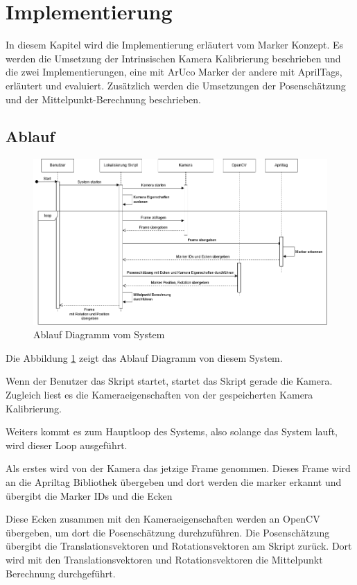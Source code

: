 \section{Implementierung}

In diesem Kapitel wird die Implementierung erläutert vom Marker Konzept. 
Es werden die Umsetzung der Intrinsischen Kamera Kalibrierung beschrieben und die zwei Implementierungen, eine mit ArUco Marker der andere mit AprilTags, erläutert und evaluiert.
Zusätzlich werden die Umsetzungen der Posenschätzung und der Mittelpunkt-Berechnung beschrieben.

\subsection{Ablauf}

\begin{figure}[H]
    \centering
    \includegraphics[width=\linewidth]{graphics/Ablauf.png}
    \caption{Ablauf Diagramm vom System}
    \label{fig:Ablauf}
\end{figure}

Die Abbildung \ref{fig:Ablauf} zeigt das Ablauf Diagramm von diesem System. 

Wenn der Benutzer das Skript startet, startet das Skript gerade die Kamera.
Zugleich liest es die Kameraeigenschaften von der gespeicherten Kamera Kalibrierung.

Weiters kommt es zum Hauptloop des Systems, also solange das System lauft, wird dieser Loop ausgeführt.

Als erstes wird von der Kamera das jetzige Frame genommen. 
Dieses Frame wird an die Apriltag Bibliothek übergeben und dort werden die marker erkannt und übergibt die Marker IDs und die Ecken

Diese Ecken zusammen mit den Kameraeigenschaften werden an OpenCV übergeben, um dort die Posenschätzung durchzuführen.
Die Posenschätzung übergibt die Translationsvektoren und Rotationsvektoren am Skript zurück. 
Dort wird mit den Translationsvektoren und Rotationsvektoren die Mittelpunkt Berechnung durchgeführt.

